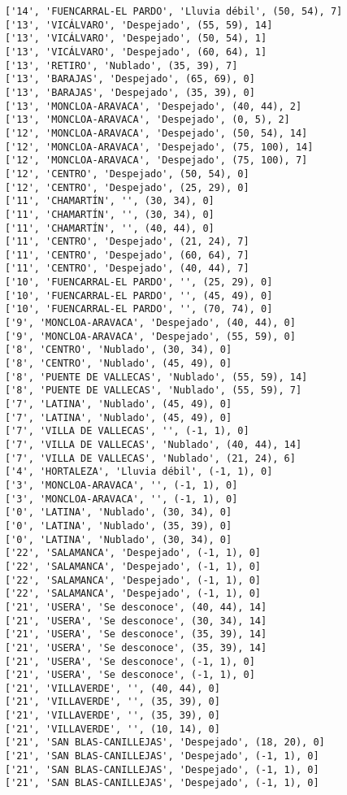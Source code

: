 \documentclass[11pt]{article}
\begin{document}
\begin{Verbatim}[commandchars=\\\{\}]
['14', 'FUENCARRAL-EL PARDO', 'Lluvia débil', (50, 54), 7]
['13', 'VICÁLVARO', 'Despejado', (55, 59), 14]
['13', 'VICÁLVARO', 'Despejado', (50, 54), 1]
['13', 'VICÁLVARO', 'Despejado', (60, 64), 1]
['13', 'RETIRO', 'Nublado', (35, 39), 7]
['13', 'BARAJAS', 'Despejado', (65, 69), 0]
['13', 'BARAJAS', 'Despejado', (35, 39), 0]
['13', 'MONCLOA-ARAVACA', 'Despejado', (40, 44), 2]
['13', 'MONCLOA-ARAVACA', 'Despejado', (0, 5), 2]
['12', 'MONCLOA-ARAVACA', 'Despejado', (50, 54), 14]
['12', 'MONCLOA-ARAVACA', 'Despejado', (75, 100), 14]
['12', 'MONCLOA-ARAVACA', 'Despejado', (75, 100), 7]
['12', 'CENTRO', 'Despejado', (50, 54), 0]
['12', 'CENTRO', 'Despejado', (25, 29), 0]
['11', 'CHAMARTÍN', '', (30, 34), 0]
['11', 'CHAMARTÍN', '', (30, 34), 0]
['11', 'CHAMARTÍN', '', (40, 44), 0]
['11', 'CENTRO', 'Despejado', (21, 24), 7]
['11', 'CENTRO', 'Despejado', (60, 64), 7]
['11', 'CENTRO', 'Despejado', (40, 44), 7]
['10', 'FUENCARRAL-EL PARDO', '', (25, 29), 0]
['10', 'FUENCARRAL-EL PARDO', '', (45, 49), 0]
['10', 'FUENCARRAL-EL PARDO', '', (70, 74), 0]
['9', 'MONCLOA-ARAVACA', 'Despejado', (40, 44), 0]
['9', 'MONCLOA-ARAVACA', 'Despejado', (55, 59), 0]
['8', 'CENTRO', 'Nublado', (30, 34), 0]
['8', 'CENTRO', 'Nublado', (45, 49), 0]
['8', 'PUENTE DE VALLECAS', 'Nublado', (55, 59), 14]
['8', 'PUENTE DE VALLECAS', 'Nublado', (55, 59), 7]
['7', 'LATINA', 'Nublado', (45, 49), 0]
['7', 'LATINA', 'Nublado', (45, 49), 0]
['7', 'VILLA DE VALLECAS', '', (-1, 1), 0]
['7', 'VILLA DE VALLECAS', 'Nublado', (40, 44), 14]
['7', 'VILLA DE VALLECAS', 'Nublado', (21, 24), 6]
['4', 'HORTALEZA', 'Lluvia débil', (-1, 1), 0]
['3', 'MONCLOA-ARAVACA', '', (-1, 1), 0]
['3', 'MONCLOA-ARAVACA', '', (-1, 1), 0]
['0', 'LATINA', 'Nublado', (30, 34), 0]
['0', 'LATINA', 'Nublado', (35, 39), 0]
['0', 'LATINA', 'Nublado', (30, 34), 0]
['22', 'SALAMANCA', 'Despejado', (-1, 1), 0]
['22', 'SALAMANCA', 'Despejado', (-1, 1), 0]
['22', 'SALAMANCA', 'Despejado', (-1, 1), 0]
['22', 'SALAMANCA', 'Despejado', (-1, 1), 0]
['21', 'USERA', 'Se desconoce', (40, 44), 14]
['21', 'USERA', 'Se desconoce', (30, 34), 14]
['21', 'USERA', 'Se desconoce', (35, 39), 14]
['21', 'USERA', 'Se desconoce', (35, 39), 14]
['21', 'USERA', 'Se desconoce', (-1, 1), 0]
['21', 'USERA', 'Se desconoce', (-1, 1), 0]
['21', 'VILLAVERDE', '', (40, 44), 0]
['21', 'VILLAVERDE', '', (35, 39), 0]
['21', 'VILLAVERDE', '', (35, 39), 0]
['21', 'VILLAVERDE', '', (10, 14), 0]
['21', 'SAN BLAS-CANILLEJAS', 'Despejado', (18, 20), 0]
['21', 'SAN BLAS-CANILLEJAS', 'Despejado', (-1, 1), 0]
['21', 'SAN BLAS-CANILLEJAS', 'Despejado', (-1, 1), 0]
['21', 'SAN BLAS-CANILLEJAS', 'Despejado', (-1, 1), 0]

\end{Verbatim}
\end{document}
